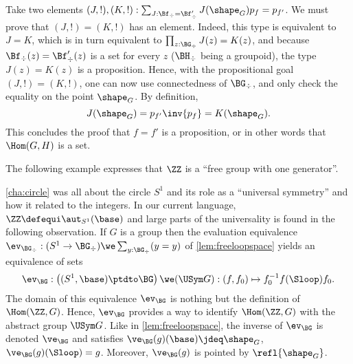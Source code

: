 \begin{example}
   Take two elements $(J,!),(K,!):\sum_{J:\Bf_\div=\Bf'_\div}J(\shape_G)p_f=p_{f'}$.  We must prove that $(J,!) = (K,!)$ has
   an element.
  Indeed,
  this type is equivalent to $J=K$, which is in turn equivalent to
  $\prod_{z:\BG_\div}J(z)=K(z)$, and because $\Bf_\div(z)=\Bf'_\div(z)$
  is a set for every $z$ ($\BH_\div$ being a groupoid), the type
  $J(z)=K(z)$ is a proposition. Hence, with the propositional goal
  $(J,!) = (K,!)$, one can now use connectedness of $\BG_\div$, and
  only check the equality on the point $\shape_G$. By definition,
  \begin{displaymath}
    J(\shape_G) = p_{f'}\inv{p_f} = K(\shape_G).
  \end{displaymath}
  This concludes the proof that $f=f'$ is a proposition, or in other
  words that $\Hom(G,H)$ is a set.

\end{example}

The following example expresses that $\ZZ$ is a ``free group with one generator''.

\begin{example}
  \label{ex:Zinitial}
  \cref{cha:circle} was all about the circle $S^1$ and its role as a
  ``universal symmetry'' and how it related to the integers.  In our
  current language, $\ZZ\defequi\aut_{S^1}(\base)$ and large parts of
  the universality is found in the following observation.  If $G$ is a
  group then the evaluation equivalence
  $\ev_{\BG_\div}:(S^1\to \BG_\div)\we \sum_{y:\BG_\div}(y=y)$ of
  \cref{lem:freeloopspace} yields an equivalence of sets
  $$\ev_{\BG}:\left((S^1,\base)\ptdto \BG\right)\we (\USym G)
            : (f,f_0)\mapsto f_0^{-1}f(\Sloop)f_0.$$
  The domain of this equivalence $\ev_{\BG}$ is nothing but the
  definition of $\Hom(\ZZ,G)$. Hence, $\ev_{\BG}$ provides a way to
  identify $\Hom(\ZZ,G)$ with the abstract group $\USym G$.
Like in \cref{lem:freeloopspace}, the inverse of $\ev_{\BG}$
is denoted $\ve_{\BG}$ and satisfies $\ve_{\BG}(g)(\base)\jdeq\shape_G$,
$\ve_{\BG}(g)(\Sloop)= g$. Moreover, $\ve_{\BG}(g)$ is pointed by $\refl{\shape_G}$.
\end{example}

